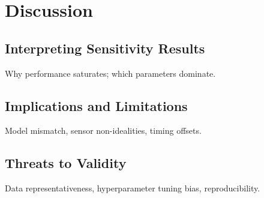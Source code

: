 \chapter{Discussion}\label{chap:discussion}

\section{Interpreting Sensitivity Results}
Why performance saturates; which parameters dominate.

\section{Implications and Limitations}
Model mismatch, sensor non-idealities, timing offsets.

\section{Threats to Validity}
Data representativeness, hyperparameter tuning bias, reproducibility.
